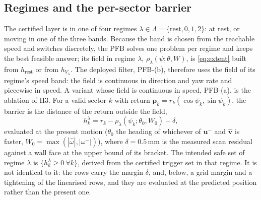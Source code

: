 \documentclass[11pt]{article}
\theoremstyle{definition}
\begin{document}
\subsection{Regimes and the per-sector barrier}
The certified layer is in one of four regimes $\lambda\in\Lambda=\{\mathrm{rest},0,1,2\}$: at rest, or
moving in one of the three bands. Because the band is chosen from the reachable speed and switches
discretely, the PFB solves one problem per regime and keeps the best feasible answer; its field in
regime $\lambda$, $\rho_\lambda(\psi;\theta,W)$, is \eqref{eq:extent} built from $h_{\mathrm{rest}}$ or
from $h_{V_\lambda}$. The deployed filter, PFB-(b), therefore uses the field of its regime's speed band: the field is
continuous in direction and yaw rate and piecewise in speed. A variant whose field is continuous in speed, PFB-(a), is
the ablation of H3. For a valid sector $k$ with return $\mathbf{p}_k=r_k(\cos\psi_k,\sin\psi_k)$, the
barrier is the distance of the return outside the field,
\begin{equation}
h^\lambda_k=r_k-\rho_\lambda(\psi_k;\theta_0,W_0)-\delta,
\label{eq:barrier}
\end{equation}
evaluated at the present motion ($\theta_0$ the heading of whichever of $\mathbf{u}^-$ and
$\hat{\mathbf{v}}$ is faster, $W_0=\max(|\hat\omega|,|\omega^-|)$), where $\delta=0.5$\,mm is the
measured scan residual against a wall face at the upper bound of its bracket. The intended safe set of regime
$\lambda$ is $\{h^\lambda_k\ge0\ \forall k\}$, derived from the certified trigger set in that regime. It is not identical to
it: the rows carry the margin $\delta$, and, below, a grid margin and a tightening of the linearised rows, and they are
evaluated at the predicted position rather than the present one.
\end{document}
